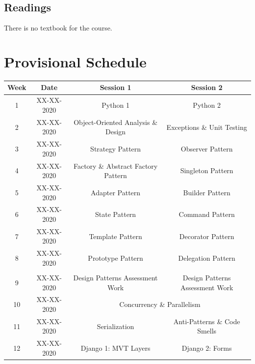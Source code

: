 \documentclass{article}
\begin{document}
\subsection*{Readings}
There is no textbook for the course.

\section*{Provisional Schedule}

\renewcommand{\arraystretch}{1.5}
\begin{tabular}{|c|c|c|c|}
	\hline
	\textbf{Week} & \textbf{Date} & \textbf{Session 1}                  & \textbf{Session 2}              \\ \hline
	1             & XX-XX-2020    & Python 1                            & Python 2                        \\ \hline					
	2             & XX-XX-2020    & Object-Oriented Analysis \& Design  & Exceptions \& Unit Testing      \\ \hline
	3             & XX-XX-2020    & Strategy Pattern                    & Observer Pattern                \\ \hline
	4             & XX-XX-2020    & Factory \& Abstract Factory Pattern & Singleton Pattern               \\ \hline
	5             & XX-XX-2020    & Adapter Pattern                     & Builder Pattern                 \\ \hline
	6             & XX-XX-2020    & State Pattern                       & Command Pattern                 \\ \hline
	7             & XX-XX-2020    & Template Pattern                    & Decorator Pattern               \\ \hline
	8             & XX-XX-2020    & Prototype Pattern                   & Delegation Pattern              \\ \hline
	\rowcolor{yellow} \multicolumn{4}{|c|}{Mid Term Break}                                                \\ \hline
	9             & XX-XX-2020    & Design Patterns Assessment Work     & Design Patterns Assessment Work \\ \hline
	10            & XX-XX-2020    & \multicolumn{2}{c|}{Concurrency \& Parallelism}      \\ \hline
	11            & XX-XX-2020    & Serialization                       & Anti-Patterns \& Code Smells    \\ \hline
	12            & XX-XX-2020    & Django 1: MVT Layers                & Django 2: Forms                 \\ \hline

\end{tabular}
\end{document}
